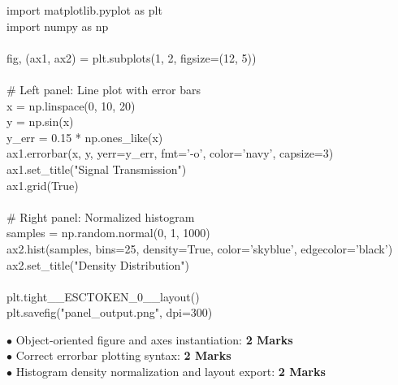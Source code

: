 \begin{solutionbox}
\begin{pycode}
import matplotlib.pyplot as plt\\
import numpy as np\\
~\\
fig, (ax1, ax2) = plt.subplots(1, 2, figsize=(12, 5))\\
~\\
\# Left panel: Line plot with error bars\\
x = np.linspace(0, 10, 20)\\
y = np.sin(x)\\
y\_err = 0.15 * np.ones\_like(x)\\
ax1.errorbar(x, y, yerr=y\_err, fmt='-o', color='navy', capsize=3)\\
ax1.set\_title("Signal Transmission")\\
ax1.grid(True)\\
~\\
\# Right panel: Normalized histogram\\
samples = np.random.normal(0, 1, 1000)\\
ax2.hist(samples, bins=25, density=True, color='skyblue', edgecolor='black')\\
ax2.set\_title("Density Distribution")\\
~\\
plt.tight\_\_ESCTOKEN\_0\_\_layout()\\
plt.savefig("panel\_output.png", dpi=300)
\end{pycode}
\begin{markingrubric}
$\bullet$ Object-oriented figure and axes instantiation: \textbf{2 Marks}\\
$\bullet$ Correct errorbar plotting syntax: \textbf{2 Marks}\\
$\bullet$ Histogram density normalization and layout export: \textbf{2 Marks}
\end{markingrubric}
\end{solutionbox}

\newpage
